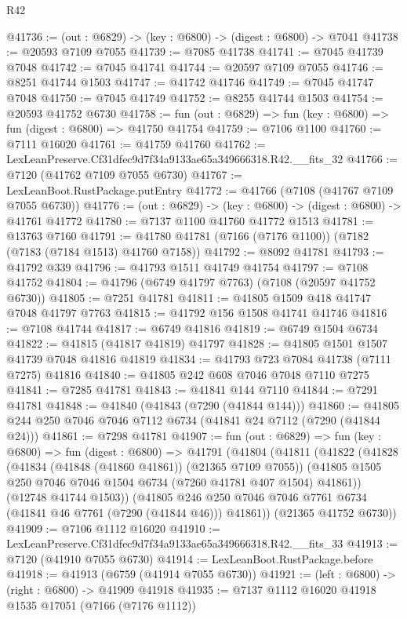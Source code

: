 \begin{lexlean}{R42}
\begin{coremodule}
{@41736 := (out : @6829) -> (key : @6800) -> (digest : @6800) -> @7041
@41738 := @20593 @7109 @7055
@41739 := @7085 @41738
@41741 := @7045 @41739 @7048
@41742 := @7045 @41741
@41744 := @20597 @7109 @7055
@41746 := @8251 @41744 @1503
@41747 := @41742 @41746
@41749 := @7045 @41747 @7048
@41750 := @7045 @41749
@41752 := @8255 @41744 @1503
@41754 := @20593 @41752 @6730
@41758 := fun (out : @6829) => fun (key : @6800) => fun (digest : @6800) => @41750 @41754
@41759 := @7106 @1100
@41760 := @7111 @16020
@41761 := @41759 @41760
@41762 := LexLeanPreserve.Cf31dfec9d7f34a9133ae65a349666318.R42.__fits_32
@41766 := @7120 (@41762 @7109 @7055 @6730)
@41767 := LexLeanBoot.RustPackage.putEntry
@41772 := @41766 (@7108 (@41767 @7109 @7055 @6730))
@41776 := (out : @6829) -> (key : @6800) -> (digest : @6800) -> @41761 @41772
@41780 := @7137 @1100 @41760 @41772 @1513
@41781 := @13763 @7160
@41791 := @41780 @41781 (@7166 (@7176 @1100)) (@7182 (@7183 (@7184 @1513) @41760 @7158))
@41792 := @8092 @41781
@41793 := @41792 @339
@41796 := @41793 @1511 @41749 @41754
@41797 := @7108 @41752
@41804 := @41796 (@6749 @41797 @7763) (@7108 (@20597 @41752 @6730))
@41805 := @7251 @41781
@41811 := @41805 @1509 @418 @41747 @7048 @41797 @7763
@41815 := @41792 @156 @1508 @41741 @41746
@41816 := @7108 @41744
@41817 := @6749 @41816
@41819 := @6749 @1504 @6734
@41822 := @41815 (@41817 @41819) @41797
@41828 := @41805 @1501 @1507 @41739 @7048 @41816 @41819
@41834 := @41793 @723 @7084 @41738 (@7111 @7275) @41816
@41840 := @41805 @242 @608 @7046 @7048 @7110 @7275
@41841 := @7285 @41781
@41843 := @41841 @144 @7110
@41844 := @7291 @41781
@41848 := @41840 (@41843 (@7290 (@41844 @144)))
@41860 := @41805 @244 @250 @7046 @7046 @7112 @6734 (@41841 @24 @7112 (@7290 (@41844 @24)))
@41861 := @7298 @41781
@41907 := fun (out : @6829) =>
  fun (key : @6800) =>
  fun (digest : @6800) =>
  @41791
    (@41804
      (@41811
        (@41822
          (@41828
            (@41834 (@41848 (@41860 @41861)) (@21365 @7109 @7055))
            (@41805 @1505 @250 @7046 @7046 @1504 @6734 (@7260 @41781 @407 @1504) @41861))
          (@12748 @41744 @1503))
        (@41805 @246 @250 @7046 @7046 @7761 @6734 (@41841 @46 @7761 (@7290 (@41844 @46))) @41861))
      (@21365 @41752 @6730))
@41909 := @7106 @1112 @16020
@41910 := LexLeanPreserve.Cf31dfec9d7f34a9133ae65a349666318.R42.__fits_33
@41913 := @7120 (@41910 @7055 @6730)
@41914 := LexLeanBoot.RustPackage.before
@41918 := @41913 (@6759 (@41914 @7055 @6730))
@41921 := (left : @6800) -> (right : @6800) -> @41909 @41918
@41935 := @7137
    @1112
    @16020
    @41918
    @1535
    @17051
    (@7166 (@7176 @1112))
}
\end{coremodule}
\end{lexlean}

